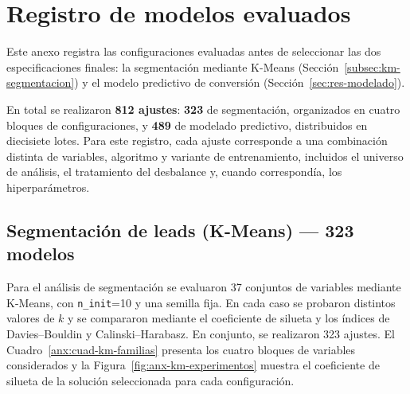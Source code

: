 \chapter{Registro de modelos evaluados}
\label{anx:modelos-evaluados}

Este anexo registra las configuraciones evaluadas antes de seleccionar las dos
especificaciones finales: la segmentación mediante K-Means
(Sección~\ref{subsec:km-segmentacion}) y el modelo predictivo de conversión
(Sección~\ref{sec:res-modelado}).

En total se realizaron \textbf{812 ajustes}: \textbf{323} de segmentación,
organizados en cuatro bloques de configuraciones, y \textbf{489} de modelado
predictivo, distribuidos en diecisiete lotes. Para este registro, cada ajuste
corresponde a una combinación distinta de variables, algoritmo y variante de
entrenamiento, incluidos el universo de análisis, el tratamiento del desbalance y,
cuando correspondía, los hiperparámetros.


\section{Segmentación de leads (K-Means) --- 323 modelos}

Para el análisis de segmentación se evaluaron 37 conjuntos de variables mediante
K-Means, con \texttt{n\_init}=10 y una semilla fija. En cada caso se probaron
distintos valores de $k$ y se compararon mediante el coeficiente de silueta y los
índices de Davies--Bouldin y Calinski--Harabasz. En conjunto, se realizaron 323
ajustes. El Cuadro~\ref{anx:cuad-km-familias} presenta los cuatro bloques de variables
considerados y la Figura~\ref{fig:anx-km-experimentos} muestra el coeficiente de
silueta de la solución seleccionada para cada configuración.

